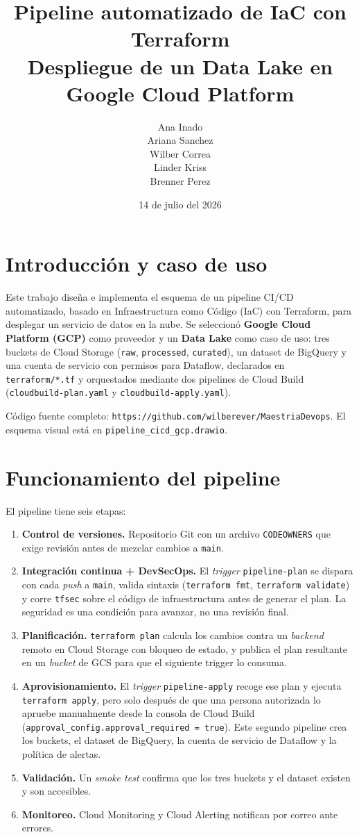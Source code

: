 \documentclass[11pt,a4paper]{article}
\title{Pipeline automatizado de IaC con Terraform \\ \large Despliegue de un Data Lake en Google Cloud Platform}
\author{
  Ana Inado \\
  Ariana Sanchez \\
  Wilber Correa \\
  Linder Kriss \\
  Brenner Perez
}
\date{14 de julio del 2026}
\begin{document}
\maketitle

\section{Introducción y caso de uso}

Este trabajo diseña e implementa el esquema de un pipeline CI/CD automatizado, basado en Infraestructura como Código (IaC) con Terraform, para desplegar un servicio de datos en la nube. Se seleccionó \textbf{Google Cloud Platform (GCP)} como proveedor y un \textbf{Data Lake} como caso de uso: tres buckets de Cloud Storage (\texttt{raw}, \texttt{processed}, \texttt{curated}), un dataset de BigQuery y una cuenta de servicio con permisos para Dataflow, declarados en \texttt{terraform/*.tf} y orquestados mediante dos pipelines de Cloud Build (\texttt{cloudbuild-plan.yaml} y \texttt{cloudbuild-apply.yaml}).

Código fuente completo: \texttt{https://github.com/wilberever/MaestriaDevops}. El esquema visual está en \texttt{pipeline\_cicd\_gcp.drawio}.

\section{Funcionamiento del pipeline}

El pipeline tiene seis etapas:

\begin{enumerate}
  \item \textbf{Control de versiones.} Repositorio Git con un archivo \texttt{CODEOWNERS} que exige revisión antes de mezclar cambios a \texttt{main}.
  \item \textbf{Integración continua + DevSecOps.} El \emph{trigger} \texttt{pipeline-plan} se dispara con cada \emph{push} a \texttt{main}, valida sintaxis (\texttt{terraform fmt}, \texttt{terraform validate}) y corre \texttt{tfsec} sobre el código de infraestructura antes de generar el plan. La seguridad es una condición para avanzar, no una revisión final.
  \item \textbf{Planificación.} \texttt{terraform plan} calcula los cambios contra un \emph{backend} remoto en Cloud Storage con bloqueo de estado, y publica el plan resultante en un \emph{bucket} de GCS para que el siguiente trigger lo consuma.
  \item \textbf{Aprovisionamiento.} El \emph{trigger} \texttt{pipeline-apply} recoge ese plan y ejecuta \texttt{terraform apply}, pero solo después de que una persona autorizada lo apruebe manualmente desde la consola de Cloud Build (\texttt{approval\_config.approval\_required = true}). Este segundo pipeline crea los buckets, el dataset de BigQuery, la cuenta de servicio de Dataflow y la política de alertas.
  \item \textbf{Validación.} Un \emph{smoke test} confirma que los tres buckets y el dataset existen y son accesibles.
  \item \textbf{Monitoreo.} Cloud Monitoring y Cloud Alerting notifican por correo ante errores.
\end{enumerate}
\end{document}
